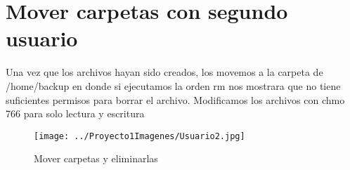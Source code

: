 \documentclass[11pt,a4paper]{article}
\begin{document}
\section{Mover carpetas con segundo usuario}
Una vez que los archivos hayan sido creados, los movemos a la carpeta de /home/backup en donde si ejecutamos la orden rm nos mostrara que no tiene suficientes permisos para borrar el archivo. Modificamos los archivos con chmo 766 para solo lectura y escritura
\begin{figure}[hbtp]
\centering
\texttt{[image: ../Proyecto1Imagenes/Usuario2.jpg]}
\caption{Mover carpetas y eliminarlas}
\end{figure}
\end{document}
